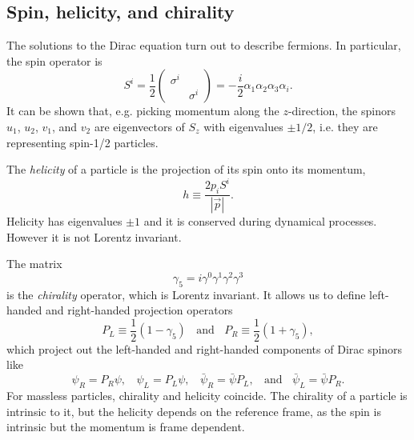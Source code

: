 \subsection{Spin, helicity, and chirality}

The solutions to the Dirac equation 
turn out to describe fermions. In particular, the spin operator
is
\begin{equation}
S^i=\frac{1}{2}\left(\begin{array}{cc}
                 \sigma^i  &   \\
                   &\sigma^i  
           \end{array}\right)
=-\frac{i}{2}\alpha_1\alpha_2\alpha_3\alpha_i.
\end{equation}
It can be shown that, e.g. picking momentum along the $z$-direction, the spinors
$u_1$, $u_2$, $v_1$, and $v_2$ are eigenvectors of $S_z$ with eigenvalues $\pm
1/2$, i.e. they are representing spin-1/2 particles.

The {\it helicity} of a particle is the projection of its spin
onto its momentum,
\begin{equation}
h\equiv \frac{2p_i S^i}{|\vec{p}|}.
\end{equation}
Helicity has eigenvalues $\pm 1$ and it is conserved during dynamical processes.
However it is not Lorentz invariant.

The matrix
\begin{equation}
  \gamma_5=i\gamma^0\gamma^1\gamma^2\gamma^3
\end{equation}
is the {\it chirality} operator, which is Lorentz invariant.
It allows us to define left-handed and right-handed projection operators
\begin{equation}\label{eq:projdef}
  P_L\equiv\frac{1}{2}(1-\gamma_5)~~~~\text{and}~~~~
  P_R\equiv\frac{1}{2}(1+\gamma_5),
\end{equation}
which project out the left-handed and right-handed components of Dirac spinors
like
\begin{equation}\label{eq:projact}
  \psi_R=P_R\psi,~~~~
  \psi_L=P_L\psi,~~~~
  \bar{\psi}_R=\bar{\psi}P_L,~~~~\text{and}~~~~
  \bar{\psi}_L=\bar{\psi}P_R.
\end{equation}
For massless particles, chirality and helicity coincide. The chirality of a
particle is intrinsic to it, but the helicity depends on the reference frame, as
the spin is intrinsic but the momentum is frame dependent. 

